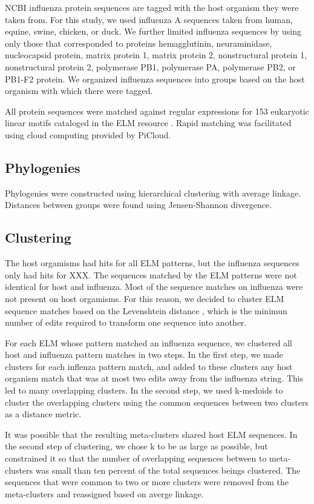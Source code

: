 \documentclass[10pt]{bmc_article}
\newenvironment{bmcformat}{\begin{raggedright}\baselineskip20pt\sloppy\setboolean{publ}{false}}{\end{raggedright}\baselineskip20pt\sloppy}
\begin{document}
\begin{bmcformat}
NCBI influenza protein sequences are tagged with the host organism
they were taken from. For this study, we used influenza A sequences
taken from human, equine, swine, chicken, or duck. We further limited
influenza sequences by using only those that corresponded to proteins
hemagglutinin, neuraminidase, nucleocapsid protein, matrix protein 1,
matrix protein 2, nonstructural protein 1, nonstructural protein 2,
polymerase PB1, polymerase PA, polymerase PB2, or PB1-F2 protein. We
organized influenza sequences into groups based on the host organism
with which there were tagged.

All protein sequences were matched against regular expressions for 153
eukaryotic linear motifs cataloged in the ELM resource
\cite{gould2010elm}. Rapid matching was facilitated using cloud
computing provided by PiCloud.

\subsection*{Phylogenies}
Phylogenies were constructed using hierarchical clustering with
average linkage. Distances between groups were found using
Jensen-Shannon divergence.

\subsection*{Clustering}
The host orgamisms had hits for all ELM patterns, but the influenza
sequences only had hits for XXX. The sequences matched by the ELM
patterns were not identical for host and influenza. Most of the
sequence matches on influenza were not present on host orgamisms. For
this reason, we decided to cluster ELM sequence matches based on the
Levenshtein distance \cite{levenshteiti1966binary}, which is the
minimun number of edits required to transform one sequence into
another.

For each ELM whose pattern matched an influenza sequence, we clustered
all host and influenza pattern matches in two steps.  In the first
step, we made clusters for each inflenza pattern match, and added to
these clusters any host organism match that was at most two edits away
from the influenza string. This led to many overlapping clusters. In
the second step, we used k-medoids to cluster the overlapping clusters
using the common sequences between two clusters as a distance
metric. 

It was possible that the resulting meta-clusters shared host
ELM sequences. In the second step of clustering, we chose k to be as
large as possible, but constrained it so that the number of
overlapping sequences between to meta-clusters was small than ten
percent of the total sequences beings clustered. The sequences that
were common to two or more clusters were removed from the
meta-clusters and reassigned based on averge linkage.


\end{bmcformat}
\end{document}
